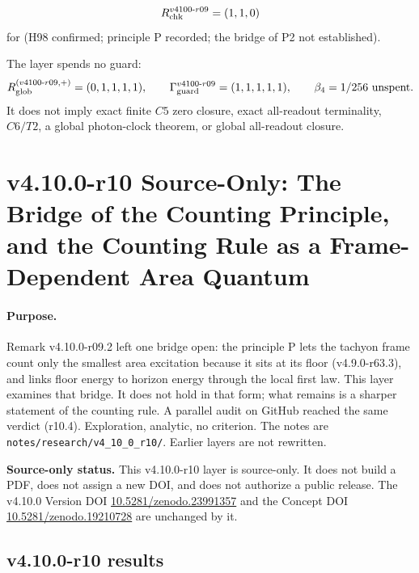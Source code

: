 \[
R_{\rm chk}^{v4100\text{-}r09}=(1,1,0)
\]
for (H98 confirmed; principle P recorded; the bridge of P2 not established).

The layer spends no guard:
\[
R_{\rm glob}^{(v4100\text{-}r09,+)}=(0,1,1,1,1),
\qquad
\Gamma_{\rm guard}^{v4100\text{-}r09}=(1,1,1,1,1),
\qquad
\beta_4=1/256\ \text{unspent}.
\]
It does not imply exact finite \(C5\) zero closure, exact all-readout terminality,
\(C6/T2\), a global photon-clock theorem, or global all-readout closure.
\clearpage
\section*{v4.10.0-r10 Source-Only: The Bridge of the Counting Principle, and the Counting Rule as a Frame-Dependent Area Quantum}
\label{sec:v4100-r10-area-quantum}

\paragraph{Purpose.}
Remark v4.10.0-r09.2 left one bridge open: the principle P lets the tachyon frame count only the smallest area excitation because it sits at its
floor (v4.9.0-r63.3), and links floor energy to horizon energy through the local first law.  This layer examines that bridge.  It does not hold in
that form; what remains is a sharper statement of the counting rule.  A parallel audit on GitHub reached the same verdict (r10.4).  Exploration, analytic, no criterion.  The notes are
\texttt{notes/\allowbreak research/\allowbreak v4\_10\_0\_r10/}.  Earlier layers are not rewritten.

\noindent\textbf{Source-only status.}
This v4.10.0-r10 layer is source-only.  It does not build a PDF, does not assign a new DOI,
and does not authorize a public release.  The v4.10.0 Version DOI
\href{https://doi.org/10.5281/zenodo.23991357}{10.5281/zenodo.23991357} and the Concept DOI
\href{https://doi.org/10.5281/zenodo.19210728}{10.5281/zenodo.19210728} are unchanged by it.

\subsection*{v4.10.0-r10 results}
\label{subsec:v4100-r10-results}

